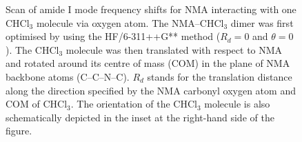 \documentclass[b5paper,oneside,fleqn,11pt]{book}
\begin{document}
\begin{refsection}
{\begin{figure}[t!]
{}
\caption{
Scan of amide I mode frequency shifts for NMA interacting 
with one CHCl$_3$ molecule via oxygen atom.
The NMA--CHCl$_3$ dimer was first optimised
by using the HF/6-311++G** method 
($R_d = 0$ and $\theta = 0$). 
The CHCl$_3$ molecule was then translated with respect to 
NMA and rotated around its centre of mass (COM) in the plane 
of NMA backbone atoms (C--C--N--C). $R_d$ stands for the translation 
distance along the direction specified by the NMA
carbonyl oxygen atom and COM of CHCl$_3$. The orientation of the CHCl$_3$
molecule is also schematically depicted in the inset at the 
right\hyp{}hand side of the figure.
\label{f:nma-orient-d}}
\end{figure}
\clearpage
}
%
\end{refsection}
\end{document}
